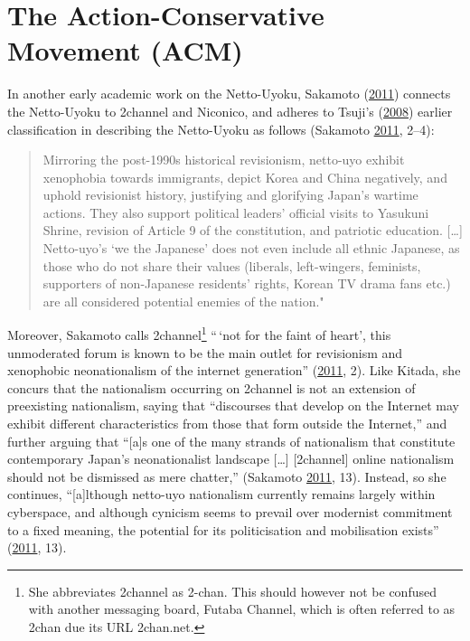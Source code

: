 \documentclass[10pt,british,A4paper,oneside]{memoir}
\begin{document}
\section{The Action-Conservative Movement
(ACM)}\label{the-action-conservative-movement-acm}

In another early academic work on the Netto-Uyoku, Sakamoto
(\protect\hyperlink{ref-sakamoto_koreans_2011}{2011}) connects the
Netto-Uyoku to 2channel and Niconico, and adheres to Tsuji's
(\protect\hyperlink{ref-tsuji_eng:_2008}{2008}) earlier classification
in describing the Netto-Uyoku as follows (Sakamoto
\protect\hyperlink{ref-sakamoto_koreans_2011}{2011}, 2--4):

\begin{quote}
Mirroring the post-1990s historical revisionism, netto-uyo exhibit
xenophobia towards immigrants, depict Korea and China negatively, and
uphold revisionist history, justifying and glorifying Japan's wartime
actions. They also support political leaders' official visits to
Yasukuni Shrine, revision of Article 9 of the constitution, and
patriotic education. {[}\ldots{}{]} Netto-uyo's `we the Japanese' does
not even include all ethnic Japanese, as those who do not share their
values (liberals, left-wingers, feminists, supporters of non-Japanese
residents' rights, Korean TV drama fans etc.) are all considered
potential enemies of the nation."
\end{quote}

Moreover, Sakamoto calls 2channel\footnote{She abbreviates 2channel as
  2-chan. This should however not be confused with another messaging
  board, Futaba Channel, which is often referred to as 2chan due its URL
  2chan.net.} ``\,`not for the faint of heart', this unmoderated forum
is known to be the main outlet for revisionism and xenophobic
neonationalism of the internet generation''
(\protect\hyperlink{ref-sakamoto_koreans_2011}{2011}, 2). Like Kitada,
she concurs that the nationalism occurring on 2channel is not an
extension of preexisting nationalism, saying that ``discourses that
develop on the Internet may exhibit different characteristics from those
that form outside the Internet,'' and further arguing that ``{[}a{]}s
one of the many strands of nationalism that constitute contemporary
Japan's neonationalist landscape {[}\ldots{}{]} {[}2channel{]} online
nationalism should not be dismissed as mere chatter,'' (Sakamoto
\protect\hyperlink{ref-sakamoto_koreans_2011}{2011}, 13). Instead, so
she continues, ``{[}a{]}lthough netto-uyo nationalism currently remains
largely within cyberspace, and although cynicism seems to prevail over
modernist commitment to a fixed meaning, the potential for its
politicisation and mobilisation exists''
(\protect\hyperlink{ref-sakamoto_koreans_2011}{2011}, 13).
\end{document}
